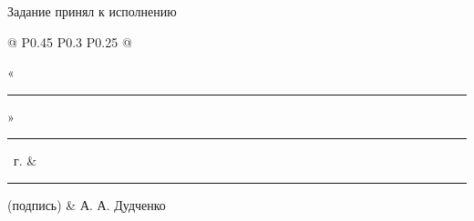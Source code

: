 \documentclass[14pt, a4paper]{extarticle}
\begin{document}
Задание принял к исполнению

{
\renewcommand{\arraystretch}{1.5}
\begin{tabularx}{\textwidth}{@{} P{0.45\textwidth} P{0.3\textwidth} P{0.25\textwidth} @{}}

    «\rule{0.8cm}{0.4pt}» \quad \rule{2cm}{0.4pt} ~г. &
    \centering \rule{3.5cm}{0.4pt} \par \footnotesize (подпись) &
    \hfill А. А. Дудченко                                           \\
\end{tabularx}
}
\end{document}
